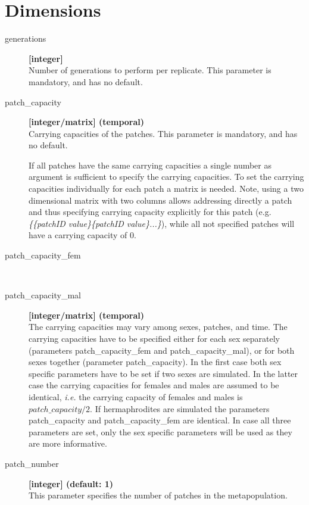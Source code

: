 \documentclass[letterpaper,12pt,oneside]{book}
\begin{document}
\section{Dimensions}
\begin{description}

\item[generations]\textbf{[integer]}\\
Number of generations to perform per replicate. This parameter is mandatory, and has no default.
\item[patch\_capacity]
\textbf{[integer/matrix] (temporal)}\\
Carrying capacities of the patches. This parameter is mandatory, and has no default.

 If all patches have the same carrying capacities a single number as argument is sufficient to specify the carrying capacities. To set the carrying capacities individually for each patch a matrix is needed. Note, using a two dimensional matrix with two columns allows addressing directly a patch and thus specifying carrying capacity explicitly for this patch (e.g. \textit{\{\{patchID value\}\{patchID value\}...\}}), while all not specified patches will have a carrying capacity of 0. 


\item[patch\_capacity\_fem]\hspace*{\fill}\\
\vspace{-9mm}
\item[patch\_capacity\_mal]\textbf{[integer/matrix] (temporal)}\\
The carrying capacities may vary among sexes, patches, and time. The carrying capacities have to be specified either for each sex separately (parameters \textsf{patch\_capacity\_fem} and \textsf{patch\_capacity\_mal}), or for both sexes together (parameter \textsf{patch\_capacity}). In the first case both sex specific parameters have to be set if two sexes are simulated. In the latter case the carrying capacities for females and males are assumed to be identical, \textit{i.e.} the carrying capacity of females and males is $patch\_capacity/2$. If hermaphrodites are simulated the parameters \textsf{patch\_capacity} and \textsf{patch\_capacity\_fem} are identical. In case all three parameters are set, only the sex specific parameters will be used as they are more informative.
\item[patch\_number] \textbf{[integer] (default: 1)}\\ 
This parameter specifies the number of patches in the metapopulation.
\end{description}
\end{document}
